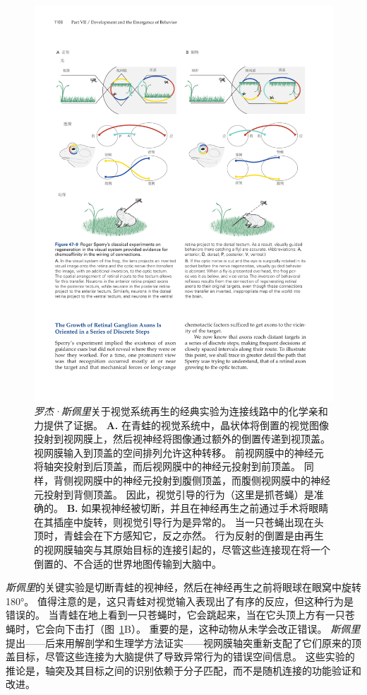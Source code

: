 \begin{figure}[htbp]
	\centering
	\includegraphics[width=0.95\linewidth]{chap47/fig_47_9}
	\caption{\textit{罗杰·斯佩里}关于视觉系统再生的经典实验为连接线路中的化学亲和力提供了证据。
		\textbf{A.} 在青蛙的视觉系统中，晶状体将倒置的视觉图像投射到视网膜上，然后视神经将图像通过额外的倒置传递到视顶盖。
		视网膜输入到顶盖的空间排列允许这种转移。
		前视网膜中的神经元将轴突投射到后顶盖，而后视网膜中的神经元投射到前顶盖。
		同样，背侧视网膜中的神经元投射到腹侧顶盖，而腹侧视网膜中的神经元投射到背侧顶盖。
		因此，视觉引导的行为（这里是抓苍蝇）是准确的。
		\textbf{B.} 如果视神经被切断，并且在神经再生之前通过手术将眼睛在其插座中旋转，则视觉引导行为是异常的。
		当一只苍蝇出现在头顶时，青蛙会在下方感知它，反之亦然。
		行为反射的倒置是由再生的视网膜轴突与其原始目标的连接引起的，尽管这些连接现在将一个倒置的、不合适的世界地图传输到大脑中。}
	\label{fig:47_9}
\end{figure}


\textit{斯佩里}的关键实验是切断青蛙的视神经，然后在神经再生之前将眼球在眼窝中旋转 180°。
值得注意的是，这只青蛙对视觉输入表现出了有序的反应，但这种行为是错误的。
当青蛙在地上看到一只苍蝇时，它会跳起来，当在它头顶上方有一只苍蝇时，它会向下击打（图~\ref{fig:47_9}B）。
重要的是，这种动物从未学会改正错误。
\textit{斯佩里}提出——后来用解剖学和生理学方法证实——视网膜轴突重新支配了它们原来的顶盖目标，尽管这些连接为大脑提供了导致异常行为的错误空间信息。
这些实验的推论是，轴突及其目标之间的识别依赖于分子匹配，而不是随机连接的功能验证和改进。



